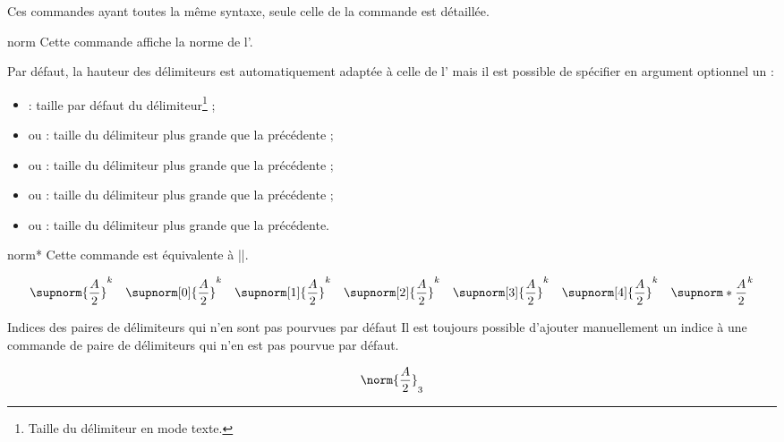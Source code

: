 \documentclass[french,nolocaltoc]{nwejmart}
\newtheorem[title=Fait,style=definition]{fact}
\begin{document}
Ces commandes ayant toutes la même syntaxe, seule celle de la commande
 est détaillée.

\begin{docCommand*}{norm}{}
  Cette commande affiche la norme de l'.

  Par défaut, la hauteur des délimiteurs est automatiquement adaptée à celle de
  l' mais il est possible de spécifier en argument optionnel un
   :
  \begin{itemize}
  \item {} : taille par défaut du délimiteur\footnote{Taille du
      délimiteur en mode texte.} ;
  \item {} ou  : taille du délimiteur plus grande
    que la précédente ;
  \item {} ou  : taille du délimiteur plus grande
    que la précédente ;
  \item {} ou  : taille du délimiteur plus grande
    que la précédente ;
  \item {} ou  : taille du délimiteur plus grande
    que la précédente.
  \end{itemize}
\end{docCommand*}

\begin{docCommand}{norm*}{}
  Cette commande est équivalente à ||.
\end{docCommand}

\begin{bodycode}
\begin{equation}
\supnorm{\frac{A}{2}}^k    \quad
\supnorm[0]{\frac{A}{2}}^k \quad
\supnorm[1]{\frac{A}{2}}^k \quad
\supnorm[2]{\frac{A}{2}}^k \quad
\supnorm[3]{\frac{A}{2}}^k \quad
\supnorm[4]{\frac{A}{2}}^k \quad
\supnorm*{\frac{A}{2}}^k
\end{equation}
\end{bodycode}

\begin{dbremark}{Indices des paires de délimiteurs qui n'en sont pas pourvues par défaut}{}
  Il est toujours possible d'ajouter manuellement un indice à une commande de
  paire de délimiteurs qui n'en est pas pourvue par défaut.
\begin{bodycode}
\begin{equation}
\norm{\frac{A}{2}}_3
\end{equation}
\end{bodycode}
\end{dbremark}
\end{document}
